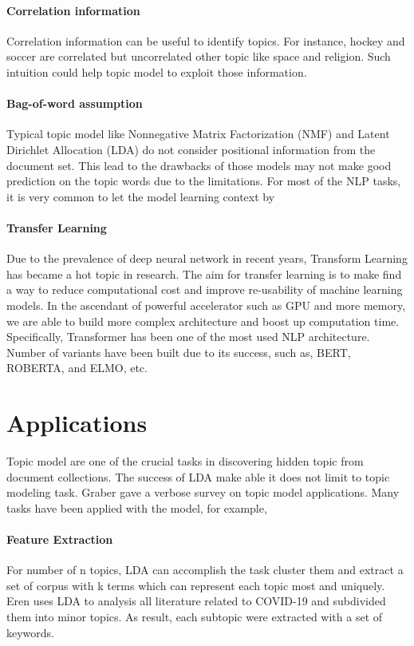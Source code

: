 \paragraph{Correlation information} Correlation information can be useful to identify topics. For instance, hockey and soccer are correlated but uncorrelated other topic like space and religion. Such intuition could help topic model to exploit those information. 
\paragraph{Bag-of-word assumption} Typical topic model like Nonnegative Matrix Factorization (NMF) \cite{paisley_bayesian_nodate} and Latent Dirichlet Allocation (LDA) \cite{blei_latent_2003} do not consider positional information from the document set. This lead to the drawbacks of those models may not make good prediction on the topic words due to the limitations. For most of the NLP tasks, it is very common to let the model learning context by
\paragraph{Transfer Learning} Due to the prevalence of deep neural network in recent years, Transform Learning has became a hot topic in research. The aim for transfer learning is to make find a way to reduce computational cost and improve re-usability of machine learning models. In the ascendant of powerful accelerator such as GPU and more memory, we are able to build more complex architecture and boost up computation time. Specifically, Transformer has been one of the most used NLP architecture. Number of variants have been built due to its success, such as, BERT\cite{devlin_bert_2019}, ROBERTA\cite{liu_roberta_2019}, and ELMO\cite{peters_deep_2018}, etc.
\section{Applications}\label{ch1:2}
Topic model are one of the crucial tasks in discovering hidden topic from document collections. The success of LDA make able it does not limit to topic modeling task. Graber\cite{boyd-graber_applications_2017} gave a verbose survey on topic model applications. Many tasks have been applied with the model, for example,
\paragraph{Feature Extraction}\label{AAA} For number of n topics, LDA can accomplish the task cluster them and extract a set of corpus with k terms which can represent each topic most and uniquely. Eren \cite{eren_covid-19_2020} uses LDA to analysis all literature related to COVID-19 and subdivided them into minor topics. As result, each subtopic were extracted with a set of keywords.
